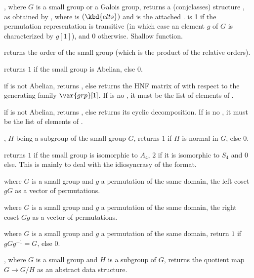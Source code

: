 , where $G$ is a small group or a Galois group,
returns a  (conjclasses) structure ,
 as obtained by , where  is
$(\kbd{elts})$ and  is the attached
.  is 1 if the permutation representation
is transitive (in which case an element $g$ of $G$ is characterized by $g[1]$),
and 0 otherwise. Shallow function.

 returns the order of the small group
 (which is the product of the relative orders).

 returns $1$ if the small group
 is Abelian, else $0$.

 if  is not Abelian,
returns , else returns the HNF matrix of  with respect to
the generating family $\var{grp}[1]$. If  is no , it must
be the list of elements of .

 if  is not Abelian,
returns , else returns its cyclic decomposition. If  is no
, it must be the list of elements of .

, $H$ being a subgroup of the
small group $G$, returns $1$ if $H$ is normal in $G$, else $0$.

 returns $1$ if the small group
 is isomorphic to $A_4$, $2$ if it is isomorphic to $S_4$ and
$0$ else. This is mainly to deal with the idiosyncrasy of the format.

 where $G$ is a small group and $g$ a
permutation of the same domain, the left coset $gG$ as a vector of
permutations.

 where $G$ is a small group and $g$ a
permutation of the same domain, the right coset $Gg$  as a vector of
permutations.

 where $G$ is a small group and
$g$ a permutation of the same domain, return $1$ if $gGg^{-1}=G$, else $0$.

, where $G$ is a small group and
$H$ is a subgroup of $G$, returns the quotient map $G\rightarrow G/H$
as an abstract data structure.

